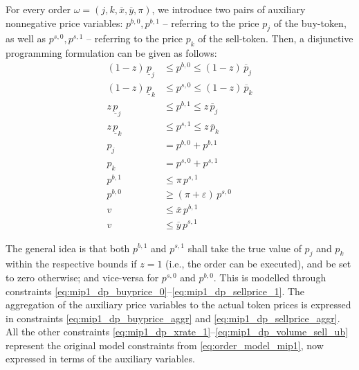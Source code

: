 \documentclass[11pt,parskip=full]{scrartcl}%
\newcommand*{\ie}{i.e., }
\begin{document}
For every order $ \omega = (j,k,\overline{x},\overline{y},\pi) $, we introduce two pairs of
auxiliary nonnegative price variables:
$ p^{b,0}, p^{b,1} $ -- referring to the price $ p_j $ of the buy-token, as well as
$ p^{s,0}, p^{s,1} $ -- referring to the price $ p_k $ of the sell-token.
Then, a disjunctive programming formulation can be given as follows:
\begin{subequations}
\begin{align}
  (1-z) \, \underline{p}_j &\le p^{b,0} \le (1-z) \, \overline{p}_j
    \label{eq:mip1_dp_buyprice_0}\\
  (1-z) \, \underline{p}_k &\le p^{s,0} \le (1-z) \, \overline{p}_k
    \label{eq:mip1_dp_sellprice_0}\\[2mm]
  z \, \underline{p}_j &\le p^{b,1} \le z \, \overline{p}_j
    \label{eq:mip1_dp_buyprice_1}\\
  z \, \underline{p}_k &\le p^{s,1} \le z \, \overline{p}_k
    \label{eq:mip1_dp_sellprice_1}\\[2mm]
  p_j &= p^{b,0} + p^{b,1}
    \label{eq:mip1_dp_buyprice_aggr}\\
  p_k &= p^{s,0} + p^{s,1}
    \label{eq:mip1_dp_sellprice_aggr}\\[2mm]
  p^{b,1} &\le \pi \, p^{s,1}
    \label{eq:mip1_dp_xrate_1}\\
  p^{b,0} &\ge (\pi+\varepsilon) \, p^{s,0}
    \label{eq:mip1_dp_xrate_0}\\[2mm]
  v &\le \overline{x} \, p^{b,1}
    \label{eq:mip1_dp_volume_buy_ub}\\
  v &\le \overline{y} \, p^{s,1}
    \label{eq:mip1_dp_volume_sell_ub}
\end{align}
\label{eq:order_model_mip1_DP}
\end{subequations}

The general idea is that both $p^{b,1}$ and $p^{s,1}$ shall take the true value of $p_j$ and
$p_k$ within the respective bounds if $z=1$ (\ie the order can be executed), and be set to
zero otherwise; and vice-versa for $p^{s,0}$ and $p^{b,0}$.
This is modelled through constraints \eqref{eq:mip1_dp_buyprice_0}--\eqref{eq:mip1_dp_sellprice_1}.
The aggregation of the auxiliary price variables to the actual token prices is expressed in
constraints \eqref{eq:mip1_dp_buyprice_aggr} and \eqref{eq:mip1_dp_sellprice_aggr}.
All the other constraints \eqref{eq:mip1_dp_xrate_1}--\eqref{eq:mip1_dp_volume_sell_ub} represent
the original model constraints from \eqref{eq:order_model_mip1}, now expressed in terms of the
auxiliary variables.
\end{document}
